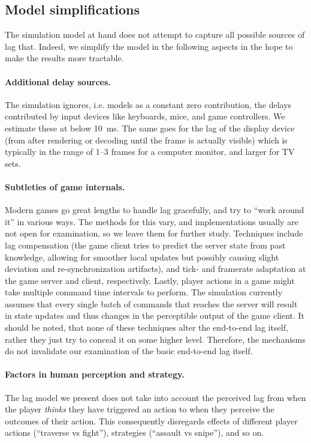 \subsection{Model simplifications}

The simulation model at hand does not attempt to capture all possible 
sources of lag that. Indeed, we simplify the model in the 
following aspects in the hope to make the results more tractable.

\paragraph{Additional delay sources.}
The simulation ignores, i.e. 
models as a constant zero contribution, the delays contributed by 
input devices like keyboards, mice, and game controllers. We estimate 
these at below \SI{10}{\milli\second}. The same goes for the  lag of 
the display device (from after rendering or decoding until the frame 
is actually visible) which is typically in the range of 1--3 frames for a computer 
monitor, and larger for TV sets. 

\paragraph{Subtleties of game internals.}
Modern games go great lengths 
to handle lag gracefully, and try to ``work around it'' in various ways. 
The methods for this vary, and implementations usually are not open 
for examination, so we leave them for further study. 
Techniques include lag compensation (the game client 
tries to predict the server state from past knowledge, allowing for 
smoother local updates but possibly causing slight deviation and 
re-synchronization artifacts), and tick- and framerate adaptation 
at the game server and client, respectively.
Lastly, player actions in a game might take multiple command time 
intervals to perform. The simulation currently assumes that every 
single batch of commands that reaches the server will result in 
state updates and thus changes in the perceptible output of the game 
client. It should be noted, that none of these techniques alter the 
end-to-end lag itself, rather they just try to conceal it on some higher level. 
Therefore, the mechanisms do not invalidate our examination of the basic 
end-to-end lag itself.

\paragraph{Factors in human perception and strategy.}
The lag model 
we present does not take into account the perceived lag from when the 
player \textit{thinks} they have triggered an action to when they 
perceive the outcomes of their action. This consequently disregards 
effects of different player actions (``traverse vs fight''), strategies 
(``assault vs snipe''), and so on.






